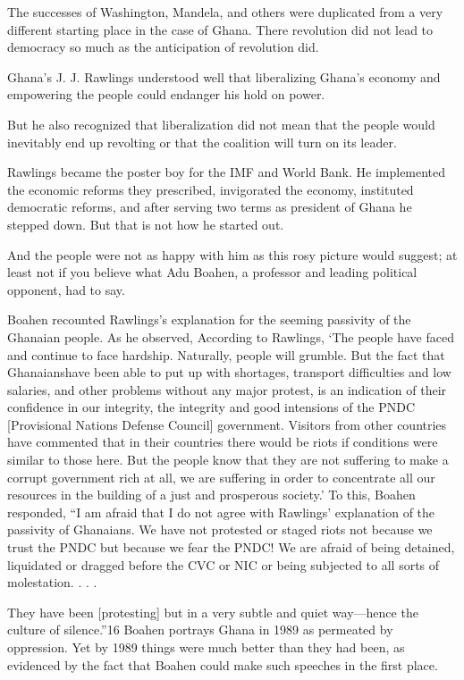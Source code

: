 \documentclass[10pt]{article}
\begin{document}
{\large The successes of Washington, Mandela, and others were duplicated from a
very different starting place in the case of Ghana. There revolution did not lead
to democracy so much as the anticipation of revolution did.}

{\large Ghana's J. J. Rawlings understood well that liberalizing Ghana's economy
and empowering the people could endanger his hold on power.}

{\large But he also recognized that liberalization did not mean that the people
would inevitably end up revolting or that the coalition will turn on its leader.}

{\large Rawlings became the poster boy for the IMF and World Bank. He
implemented the economic reforms they prescribed, invigorated the economy,
instituted democratic reforms, and after serving two terms as president of Ghana
he stepped down. But that is not how he started out.}

{\large And the people were not as happy with him as this rosy picture would
suggest; at least not if you believe what Adu Boahen, a professor and leading
political opponent, had to say.}

{\large Boahen recounted Rawlings's explanation for the seeming passivity of the
Ghanaian people. As he observed, According to Rawlings, `The people have faced
and continue to face hardship. Naturally, people will grumble. But the fact that
Ghanaianshave been able to put up with shortages, transport difficulties and low
salaries, and other problems without any major protest, is an indication of their
confidence in our integrity, the integrity and good intensions of the PNDC
[Provisional Nations Defense Council] government. Visitors from other countries
have commented that in their countries there would be riots if conditions were
similar to those here. But the people know that they are not suffering to make a
corrupt government rich at all, we are suffering in order to concentrate all our
resources in the building of a just and prosperous society.' To this, Boahen
responded, ``I am afraid that I do not agree with Rawlings' explanation of the
passivity of Ghanaians. We have not protested or staged riots not because we
trust the PNDC but because we fear the PNDC! We are afraid of being detained,
liquidated or dragged before the CVC or NIC or being subjected to all sorts of
molestation. . . .}

{\large They have been [protesting] but in a very subtle and quiet way---hence
the culture of silence.''16 Boahen portrays Ghana in 1989 as permeated by
oppression. Yet by 1989 things were much better than they had been, as evidenced
by the fact that Boahen could make such speeches in the first place.}
\end{document}
